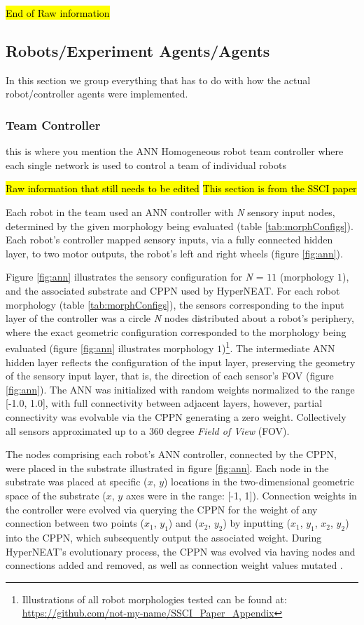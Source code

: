 \documentclass[conference]{IEEEtran}
\begin{document}
\hl{End of Raw information}

\subsection{Robots/Experiment Agents/Agents}

In this section we group everything that has to do with how the actual robot/controller agents were implemented. 

\subsubsection{Team Controller}
this is where you mention the ANN 
Homogeneous robot team controller where each single network is used to control a team of individual robots

\hl{Raw information that still needs to be edited}
\hl{This section is from the SSCI paper}

Each robot in the team used an ANN controller with
\textit{N} sensory input nodes, determined by the given morphology being evaluated (table \ref{tab:morphConfigs}).
Each robot's controller mapped sensory inputs, via a fully connected hidden layer, to two motor outputs, the
robot's left and right wheels (figure \ref{fig:ann}). %

Figure \ref{fig:ann} illustrates the sensory configuration for \textit{N} = $11$ (morphology $1$), and the
associated substrate and CPPN used by HyperNEAT.
For each robot morphology (table \ref{tab:morphConfigs}), the sensors corresponding to the input layer
of the controller was a circle \textit{N} nodes distributed about a robot's periphery,
where the exact geometric configuration corresponded to the morphology being evaluated
(figure \ref{fig:ann} illustrates morphology
$1$)\footnote{Illustrations of all robot morphologies tested can be found at: \url{https://github.com/not-my-name/SSCI_Paper_Appendix}}.
The intermediate ANN hidden layer reflects the configuration of the input layer, preserving
the geometry of the sensory input layer, that is, the direction of each sensor's FOV (figure
\ref{fig:ann}).
The ANN was initialized with random weights normalized to the range [-1.0, 1.0], with full connectivity between adjacent layers,
however, partial connectivity was evolvable via the CPPN generating a zero weight.
Collectively all sensors approximated up to a $360$ degree \textit{Field of View} (FOV).

The nodes comprising each robot's ANN controller, connected by the CPPN, were placed in the substrate
illustrated in figure \ref{fig:ann}.
Each node in the substrate was placed at specific ($x$, $y$) locations in the two-dimensional geometric space
of the substrate ($x$, $y$ axes were in the range: [-1, 1]).
Connection weights in the controller were evolved via querying the CPPN for the weight of any connection
between two points ($x_{1}$, $y_{1}$) and ($x_{2}$, $y_{2}$) by inputting ($x_{1}$, $y_{1}$, $x_{2}$, $y_{2}$)
into the CPPN, which subsequently output the associated weight.
During HyperNEAT's evolutionary process, the CPPN was evolved via having nodes and connections added and removed, as well
as connection weight values mutated \cite{StanleyDAmbrosioGauci2009}.
\end{document}
